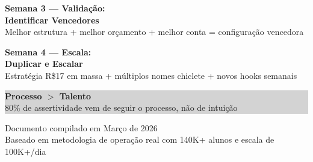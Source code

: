 \documentclass[12pt, a4paper]{article}
\begin{document}
\begin{center}
\begin{flushleft}
    \textbf{Semana 3 --- Validação:} \\
    \vspace{0.3cm}
    \hspace{1cm} \textcolor{accentColor}{\Large \textbf{Identificar Vencedores}} \\
    \hspace{1cm} \textcolor{secondaryText}{Melhor estrutura + melhor orçamento + melhor conta = configuração vencedora} \\

    \vspace{1cm}

    \textbf{Semana 4 --- Escala:} \\
    \vspace{0.3cm}
    \hspace{1cm} \textcolor{accentColor}{\Large \textbf{Duplicar e Escalar}} \\
    \hspace{1cm} \textcolor{secondaryText}{Estratégia R\$17 em massa + múltiplos nomes chiclete + novos hooks semanais} \\
    \end{flushleft}

    \vspace{0.5cm}

    \colorbox{lightGray}{%
        \parbox{0.9\textwidth}{%
            \centering
            \vspace{0.4cm}
            \textcolor{primaryColor}{\large \textbf{Processo $>$ Talento}} \\
            \vspace{0.2cm}
            \textcolor{secondaryText}{\normalsize 80\% de assertividade vem de seguir o processo, não de intuição} \\
            \vspace{0.4cm}
        }%
    }

    \vfill

    \textcolor{secondaryText}{\footnotesize Documento compilado em Março de 2026} \\
    \textcolor{secondaryText}{\footnotesize Baseado em metodologia de operação real com 140K+ alunos e escala de 100K+/dia}

\end{center}
\end{document}
